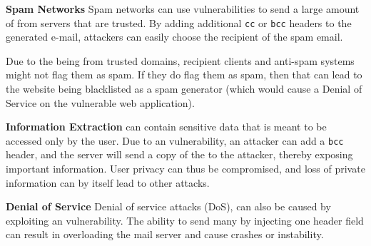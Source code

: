 \noindent\textbf{Spam Networks}
	Spam networks can use \ehi vulnerabilities to send a large amount of \email from servers that are trusted. By adding additional \texttt{cc} or \texttt{bcc} headers to the generated e-mail, attackers can easily choose the recipient of the spam email. 
	
	Due to the \email being from trusted domains, recipient \email clients and anti-spam systems might not flag them as spam. If they do flag them as spam, then that can lead to the website being blacklisted as a spam generator (which would cause a Denial of Service on the vulnerable web application). 
	
\noindent\textbf{Information Extraction}
	\Emails can contain sensitive data that is meant to be accessed only by the user. Due to an \ehi vulnerability, an attacker can add a \texttt{bcc} header, and the \email server will send a copy of the \email to the attacker, thereby exposing important information.
	User privacy can thus be compromised, and loss of private information can by itself lead to other attacks.

    \noindent\textbf{Denial of Service}
    Denial of service attacks (DoS), can also be caused by exploiting an \ehi vulnerability. The ability to send many \emails by injecting one header field can result in overloading the mail server and cause crashes or instability. 

